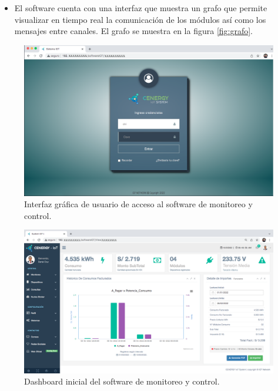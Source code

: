 \begin{itemize}
\item El software cuenta con una interfaz que muestra un grafo que permite visualizar en tiempo real la comunicación de los módulos así como los mensajes entre canales. El grafo se muestra en la figura \ref{fig:grafo}.


\end{itemize}






\begin{landscape} %
\begin{figure}[htpb]
\centering 
\includegraphics[width=1.55\textwidth]{./Figures/gui/0.png}
\caption{Interfaz gráfica de usuario de acceso al software de monitoreo y control.}
\label{fig:gui0}
\end{figure}
\end{landscape} %


\begin{landscape} %
\begin{figure}[htpb]
\centering 
\includegraphics[width=1.55\textwidth]{./Figures/gui/1.png}
\caption{Dashboard inicial del software de monitoreo y control.}
\label{fig:gui1}
\end{figure}
\end{landscape} %

